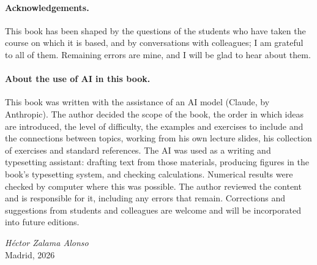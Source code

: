 \paragraph{Acknowledgements.}
This book has been shaped by the questions of the students who have taken the course on which it is based, and by conversations with colleagues; I am grateful to all of them. Remaining errors are mine, and I will be glad to hear about them.

\paragraph{About the use of AI in this book.}
This book was written with the assistance of an AI model (Claude, by Anthropic). The author decided the scope of the book, the order in which ideas are introduced, the level of difficulty, the examples and exercises to include and the connections between topics, working from his own lecture slides, his collection of exercises and standard references.
The AI was used as a writing and typesetting assistant: drafting text from those materials, producing figures in the book's typesetting system, and checking calculations. Numerical results were checked by computer where this was possible. The author reviewed the content and is responsible for it, including any errors that remain.
Corrections and suggestions from students and colleagues are welcome and will be incorporated into future editions.

\vspace{1.5em}
\begin{flushright}
  \textit{Héctor Zalama Alonso}\\
  Madrid, 2026
\end{flushright}
